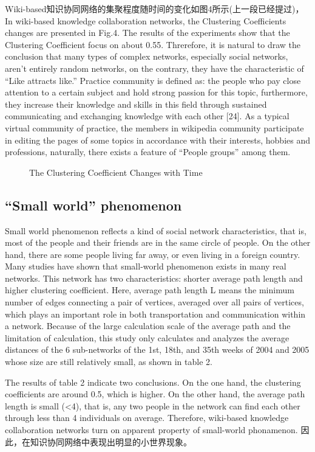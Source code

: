 \documentclass{elsarticle}
\begin{document}
Wiki-based知识协同网络的集聚程度随时间的变化如图4所示(上一段已经提过)，In wiki-based knowledge collaboration networks, the Clustering Coefficients changes are presented in Fig.4. The results of the experiments show that the Clustering Coefficient focus on about 0.55. Threrefore, it is natural to draw the conclusion that many types of complex networks, especially social networks, aren’t entirely random networks, on the contrary, they have the characteristic of “Like attracts like.” Practice community is defined as: the people who pay close attention to a certain subject and hold strong passion for this topic, furthermore, they increase their knowledge and skills in this field through sustained communicating and exchanging knowledge with each other [24]. As a typical virtual community of practice, the members in wikipedia community participate in editing the pages of some topics in accordance with their interests, hobbies and professions, naturally, there exists a feature of “People groups” among them.
\begin{figure}[htpb]
  \centering
  \scalebox{0.3}{\texttt{[image: 04]}}
  \caption{ The Clustering Coefficient Changes with Time}
\end{figure}

\subsection{“Small world” phenomenon }
\label{sec:small-world-phen}

Small world phenomenon reflects a kind of social network characteristics, that is, most of the people and their friends are in the same circle of people. On the other hand, there are some people living far away, or even living in a foreign country. Many studies have shown that small-world phenomenon exists in many real networks. This network has two characteristics: shorter average path length and higher clustering coefficient. Here, average path length L means the minimum number of edges connecting a pair of vertices, averaged over all pairs of vertices, which plays an important role in both transportation and communication within a network. Because of the large calculation scale of the average path and the limitation of calculation, this study only calculates and analyzes the average distances of the 6 sub-networks of the 1st, 18th, and 35th weeks of 2004 and 2005 whose size are still relatively small, as shown in table 2.

The results of table 2 indicate two conclusions. On the one hand, the clustering coefficients are around 0.5, which is higher. On the other hand, the average path length is small (<4), that is, any two people in the network can find each other through less than 4 individuals on average. Therefore, wiki-based knowledge collaboration networks turn on apparent property of small-world phonamenon. 因此，在知识协同网络中表现出明显的小世界现象。
\end{document}

